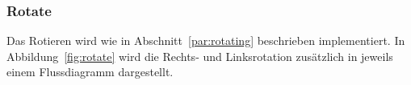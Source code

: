 \subsubsection{Rotate}\label{par:MethodRotate}
Das Rotieren wird wie in Abschnitt~\ref{par:rotating} beschrieben implementiert.
In Abbildung~\ref{fig:rotate} wird die Rechts- und Linksrotation zusätzlich in jeweils einem
Flussdiagramm dargestellt.
\begin{figure}[hbtp]
    \centering

\end{figure}
